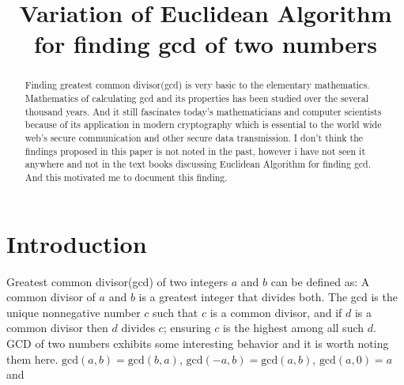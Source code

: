 \documentclass[conference]{IEEEtran}
\renewcommand{\gcd}{\text{gcd}}
\begin{document}
%
\title {Variation of Euclidean Algorithm for finding gcd of two numbers} 

\author{
}


\maketitle

\begin{abstract}
Finding greatest common divisor(gcd) is very basic to the elementary mathematics.
Mathematics of calculating gcd and its properties has been studied over the several thousand years. And it still fascinates today's mathematicians and computer scientists 
because of its application in modern cryptography which is essential to the world wide web's secure communication and other secure data transmission.
I don't think the findings proposed in this paper is not noted in the past, however i have not seen it anywhere and not in the text books discussing Euclidean Algorithm for finding gcd. And this motivated me to document this finding. 
\end{abstract}


\section{Introduction}
Greatest common divisor(gcd) of two integers $a$ and $b$ can be defined as: A common divisor of $a$ and $b$ is a greatest integer that divides both. The gcd is the unique	nonnegative number $c$ such that $c$ is a common divisor, and if $d$ is a common divisor then $d$ divides $c$; ensuring $c$ is the highest among all such $d$. 
GCD of two numbers exhibits some interesting behavior and it is worth noting them here.
$\gcd(a,b)=\gcd(b,a)$, $\gcd(-a,b)=\gcd(a,b)$,  $\gcd(a,0)=a$ and
\end{document}

